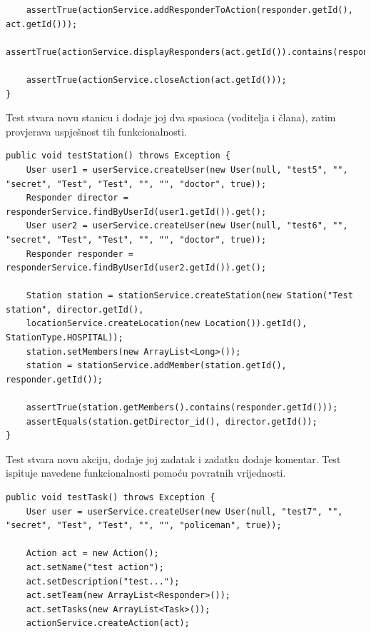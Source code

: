 \begin{packed_enum}
\begin{lstlisting}
	assertTrue(actionService.addResponderToAction(responder.getId(), act.getId()));
	assertTrue(actionService.displayResponders(act.getId()).contains(responder));
	
	assertTrue(actionService.closeAction(act.getId()));
}
				\end{lstlisting}
				\item Test stvara novu stanicu i dodaje joj dva spasioca (voditelja i člana), zatim provjerava uspješnost tih funkcionalnosti.
				\begin{lstlisting}
public void testStation() throws Exception {
	User user1 = userService.createUser(new User(null, "test5", "", "secret", "Test", "Test", "", "", "doctor", true));
	Responder director = responderService.findByUserId(user1.getId()).get();
	User user2 = userService.createUser(new User(null, "test6", "", "secret", "Test", "Test", "", "", "doctor", true));
	Responder responder = responderService.findByUserId(user2.getId()).get();
	
	Station station = stationService.createStation(new Station("Test station", director.getId(),
	locationService.createLocation(new Location()).getId(), StationType.HOSPITAL));
	station.setMembers(new ArrayList<Long>());
	station = stationService.addMember(station.getId(), responder.getId());
	
	assertTrue(station.getMembers().contains(responder.getId()));
	assertEquals(station.getDirector_id(), director.getId());
}
				\end{lstlisting}
				\item Test stvara novu akciju, dodaje joj zadatak i zadatku dodaje komentar. Test ispituje navedene funkcionalnosti pomoću povratnih vrijednosti.
				\begin{lstlisting}
public void testTask() throws Exception {
	User user = userService.createUser(new User(null, "test7", "", "secret", "Test", "Test", "", "", "policeman", true));
	
	Action act = new Action();
	act.setName("test action");
	act.setDescription("test...");
	act.setTeam(new ArrayList<Responder>());
	act.setTasks(new ArrayList<Task>());
	actionService.createAction(act);
	

\end{lstlisting}
\end{packed_enum}
